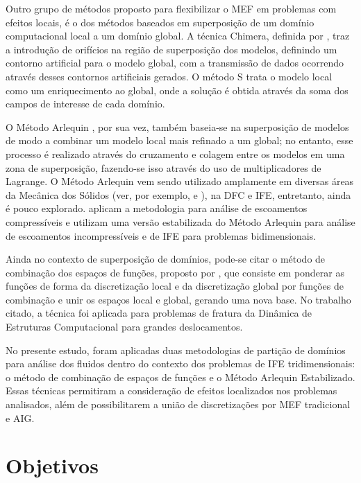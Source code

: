 Outro grupo de métodos proposto para flexibilizar o MEF em problemas com efeitos locais, é o dos métodos baseados em superposição de um domínio computacional local a um domínio global. A técnica Chimera, definida por , traz a introdução de orifícios na região de superposição dos modelos, definindo um contorno artificial para o modelo global, com a transmissão de dados ocorrendo através desses contornos artificiais gerados. O método S \cite{Fish:1992} trata o modelo local como um enriquecimento ao global, onde a solução é obtida através da soma dos campos de interesse de cada domínio.

O Método Arlequin \cite{Dhia:1998,DhiaR:2001}, por sua vez, também baseia-se na superposição de modelos de modo a combinar um modelo local mais refinado a um global; no entanto, esse processo é realizado através do cruzamento e colagem entre os modelos em uma zona de superposição, fazendo-se isso através do uso de multiplicadores de Lagrange.  O Método Arlequin vem sendo utilizado amplamente em diversas áreas da Mecânica dos Sólidos (ver, por exemplo,  e ), na DFC e IFE, entretanto, ainda é pouco explorado.  aplicam a metodologia para análise de escoamentos compressíveis e  utilizam uma versão estabilizada do Método Arlequin para análise de escoamentos incompressíveis e de IFE para problemas bidimensionais.

Ainda no contexto de superposição de domínios, pode-se citar o método de combinação dos espaços de funções, proposto por , que consiste em ponderar as funções de forma da discretização local e da discretização global por funções de combinação e unir os espaços local e global, gerando uma nova base. No trabalho citado, a técnica foi aplicada para problemas de fratura da Dinâmica de Estruturas Computacional para grandes deslocamentos.

No presente estudo, foram aplicadas duas metodologias de partição de domínios para análise dos fluidos dentro do contexto dos problemas de IFE tridimensionais: o método de combinação de espaços de funções e o Método Arlequin Estabilizado. Essas técnicas permitiram a consideração de efeitos localizados nos problemas analisados, além de possibilitarem a união de discretizações por MEF tradicional e AIG.

\section[Objetivos]{Objetivos}

